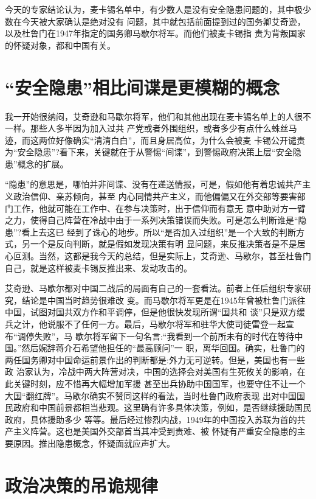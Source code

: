 \documentclass[10pt]{article}
\begin{document}
{今天的专家结论认为，麦卡锡名单中，有少数人是没有安全隐患问题的，其中极少数在今天被大家确认是绝对没有
问题，其中就包括前面提到过的国务卿艾奇逊，以及杜鲁门在1947年指定的国务卿马歇尔将军。而他们被麦卡锡指
责为背叛国家的怀疑对象，都和中国有关。

\pagebreak
\section{ ``安全隐患''相比间谍是更模糊的概念}

我一开始很纳闷，艾奇逊和马歇尔将军，他们和其他出现在麦卡锡名单上的人很不一样。那些人多半因为加入过共
产党或者外围组织，或者多少有点什么蛛丝马迹，而这两位好像确实``清清白白''，而且身居高位，为什么会被麦
卡锡公开谴责为``安全隐患''?看下来，关键就在于从警惕``间谍''，到警惕政府决策上层``安全隐患''概念的扩展。

 ``隐患''的意思是，哪怕并非间谍、没有在递送情报，可是，假如他有着忠诚共产主义政治信仰、亲苏倾向，甚至
内心同情共产主义，而他偏偏又在外交部等要害部门工作，他就可能在工作中、在参与决策时，出于信仰而有意无
意中助对方一臂之力，使得自己阵营在冷战中由于一系列决策错误而失败。可是怎么判断谁是``隐患''?看上去这已
经到了诛心的地步。所以``是否加入过组织''是一个大致的判断方式，另一个是反向判断，就是假如发现决策有明
显问题，来反推决策者是不是居心叵测。当然，这都是我今天的总结，但是实际上，艾奇逊、马歇尔，甚至杜鲁门
自己，就是这样被麦卡锡反推出来、发动攻击的。

艾奇逊、马歇尔都对中国二战后的局面有自己的一套看法。前者上任后组织专家研究，结论是中国当时趋势很难改
变。而马歇尔将军更是在1945年曾被杜鲁门派往中国，试图对国共双方作和平调停，但是他很快发现所谓``国共和
谈''只是双方缓兵之计，他说服不了任何一方。最后，马歇尔将军和驻华大使司徒雷登一起宣布``调停失败''，马
歇尔将军留下一句名言:``我看到一个前所未有的时代在等待中国。''然后婉辞蒋介石希望他担任的``最高顾问''一
职，离华回国。确实，杜鲁门的两任国务卿对中国命运前景作出的判断都是:外力无可逆转。但是，美国也有一些政
治家认为，冷战中两大阵营对决，中国的选择会对美国有生死攸关的影响，在此关键时刻，应不惜再大幅增加军援
甚至出兵协助中国国军，也要守住不让一个大国``翻红牌''。马歇尔确实不赞同这样的看法，当时杜鲁门政府表现
出对中国国民政府和中国前景都相当悲观。这里确有许多具体决策，例如，是否继续援助国民政府，具体援助多少
等等。最后经过惨烈内战，1949年的中国投入苏联为首的共产主义阵营。这也是美国外交部首当其冲受到责难、被
怀疑有严重安全隐患的主要原因。推出隐患概念，怀疑面就应声扩大。

\pagebreak
\section{政治决策的吊诡规律}

}
\end{document}
